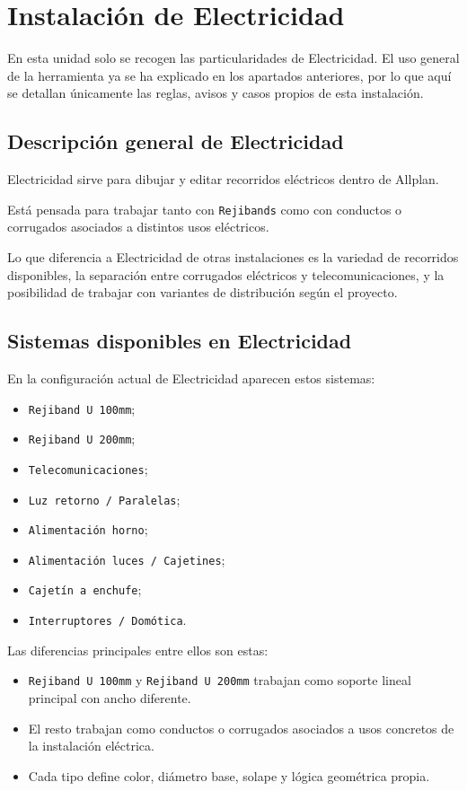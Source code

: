 \documentclass[12pt,a4paper]{article}
\begin{document}
\section{Instalación de Electricidad}

En esta unidad solo se recogen las particularidades de Electricidad. El uso general de la herramienta ya se ha explicado en los apartados anteriores, por lo que aquí se detallan únicamente las reglas, avisos y casos propios de esta instalación.

\subsection{Descripción general de Electricidad}

Electricidad sirve para dibujar y editar recorridos eléctricos dentro de Allplan.

Está pensada para trabajar tanto con \texttt{Rejibands} como con conductos o corrugados asociados a distintos usos eléctricos.

Lo que diferencia a Electricidad de otras instalaciones es la variedad de recorridos disponibles, la separación entre corrugados eléctricos y telecomunicaciones, y la posibilidad de trabajar con variantes de distribución según el proyecto.

\subsection{Sistemas disponibles en Electricidad}

En la configuración actual de Electricidad aparecen estos sistemas:

\begin{itemize}
\item \texttt{Rejiband U 100mm};
\item \texttt{Rejiband U 200mm};
\item \texttt{Telecomunicaciones};
\item \texttt{Luz retorno / Paralelas};
\item \texttt{Alimentación horno};
\item \texttt{Alimentación luces / Cajetines};
\item \texttt{Cajetín a enchufe};
\item \texttt{Interruptores / Domótica}.
\end{itemize}

Las diferencias principales entre ellos son estas:

\begin{itemize}
\item \texttt{Rejiband U 100mm} y \texttt{Rejiband U 200mm} trabajan como soporte lineal principal con ancho diferente.
\item El resto trabajan como conductos o corrugados asociados a usos concretos de la instalación eléctrica.
\item Cada tipo define color, diámetro base, solape y lógica geométrica propia.
\end{itemize}
\end{document}
